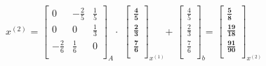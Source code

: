 \documentclass[tikz,12pt,margin=0px]{article}
\newcommand\ddfrac[2]{\frac{\displaystyle #1}{\displaystyle #2}}
\begin{document}
    \begin{center}
        $x^{(2)}$ =
        $\begin{bmatrix}
            0 & -\ddfrac{2}{5} & \ddfrac{1}{5} \\[0.3em]
            0 & 0 & \ddfrac{1}{3} \\[0.3em]
            -\ddfrac{2}{6} & \ddfrac{1}{6} & 0 \\[0.3em]
        \end{bmatrix}_{A} \cdot$
        $\begin{bmatrix}
            \ddfrac{\textbf{4}}{\textbf{5}} \\[0.3em]
            \ddfrac{\textbf{2}}{\textbf{3}} \\[0.3em]
            \ddfrac{\textbf{7}}{\textbf{6}} \\[0.3em]
        \end{bmatrix}_{x^{(1)}}$+
        $\begin{bmatrix}
            \ddfrac{4}{5} \\[0.3em]
            \ddfrac{2}{3} \\[0.3em]
            \ddfrac{7}{6} \\[0.3em]
        \end{bmatrix}_{b}$=
        $\begin{bmatrix}
            \ddfrac{\textbf{5}}{\textbf{8}} \\[0.3em]
            \ddfrac{\textbf{19}}{\textbf{18}} \\[0.3em]
            \ddfrac{\textbf{91}}{\textbf{90}} \\[0.3em]
        \end{bmatrix}_{x^{(2)}}$
    \end{center}
\end{document}
